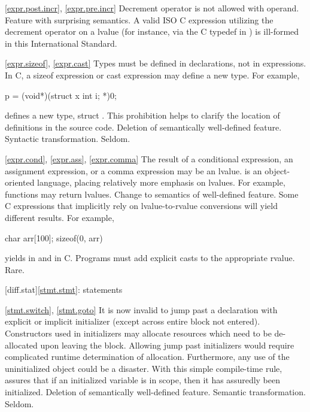 \ref{expr.post.incr}, \ref{expr.pre.incr}
\change
Decrement operator is not allowed with  operand.
\rationale Feature with surprising semantics.
\effect A valid ISO C expression utilizing the decrement operator on
a  lvalue (for instance, via the C typedef in )
is ill-formed in this International Standard.

\ref{expr.sizeof}, \ref{expr.cast}
\change Types must be defined in declarations, not in expressions.\\
In C, a sizeof expression or cast expression may define a new type.
For example,
\begin{codeblock}
p = (void*)(struct x {int i;} *)0;
\end{codeblock}
defines a new type, struct .
\rationale
This prohibition helps to clarify the location of
definitions in the source code.
\effect
Deletion of semantically well-defined feature.
\difficulty
Syntactic transformation.
\howwide
Seldom.

\ref{expr.cond}, \ref{expr.ass}, \ref{expr.comma}
%
%
%
\change The result of a conditional expression, an assignment expression, or a comma expression may be an lvalue.
\rationale
\Cpp is an object-oriented language, placing relatively
more emphasis on lvalues.  For example, functions may
return lvalues.
\effect
Change to semantics of well-defined feature.  Some C
expressions that implicitly rely on lvalue-to-rvalue
conversions will yield different results.  For example,

\begin{codeblock}
char arr[100];
sizeof(0, arr)
\end{codeblock}

yields
in \Cpp and
in C.
\difficulty
Programs must add explicit casts to the appropriate rvalue.
\howwide
Rare.

[diff.stat]{\ref{stmt.stmt}: statements}

\ref{stmt.switch}, \ref{stmt.goto}
\change It is now invalid to jump past a declaration with explicit or implicit initializer (except across entire block not entered).
\rationale
Constructors used in initializers may allocate
resources which need to be de-allocated upon leaving the
block.
Allowing jump past initializers would require
complicated runtime determination of allocation.
Furthermore, any use of the uninitialized object could be a
disaster.
With this simple compile-time rule, \Cpp assures that
if an initialized variable is in scope, then it has assuredly been
initialized.
\effect
Deletion of semantically well-defined feature.
\difficulty
Semantic transformation.
\howwide
Seldom.

